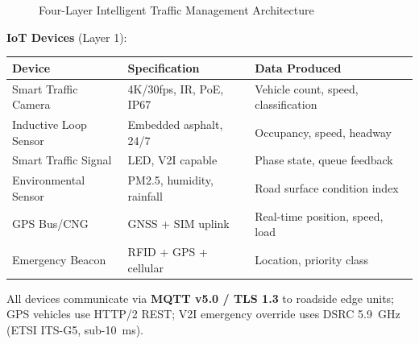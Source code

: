 \documentclass[11pt,a4paper]{article}
\begin{document}
\begin{figure}[h]
\caption{Four-Layer Intelligent Traffic Management Architecture}
\label{fig:arch}
\end{figure}

\vspace{-4pt}

\noindent\textbf{IoT Devices} (Layer 1):

\renewcommand{\arraystretch}{1.2}
\begin{center}
\begin{tabular}{|L{3.2cm}|L{3.8cm}|L{4.5cm}|}
\hline
\textbf{Device} & \textbf{Specification} & \textbf{Data Produced} \\
\hline
Smart Traffic Camera & 4K/30fps, IR, PoE, IP67 & Vehicle count, speed, classification \\
\hline
Inductive Loop Sensor & Embedded asphalt, 24/7 & Occupancy, speed, headway \\
\hline
Smart Traffic Signal & LED, V2I capable & Phase state, queue feedback \\
\hline
Environmental Sensor & PM2.5, humidity, rainfall & Road surface condition index \\
\hline
GPS Bus/CNG & GNSS + SIM uplink & Real-time position, speed, load \\
\hline
Emergency Beacon & RFID + GPS + cellular & Location, priority class \\
\hline
\end{tabular}
\end{center}

All devices communicate via \textbf{MQTT v5.0 / TLS 1.3} to roadside edge units; GPS vehicles use HTTP/2 REST; V2I emergency override uses DSRC 5.9~GHz (ETSI ITS-G5, sub-10~ms).
\end{document}
